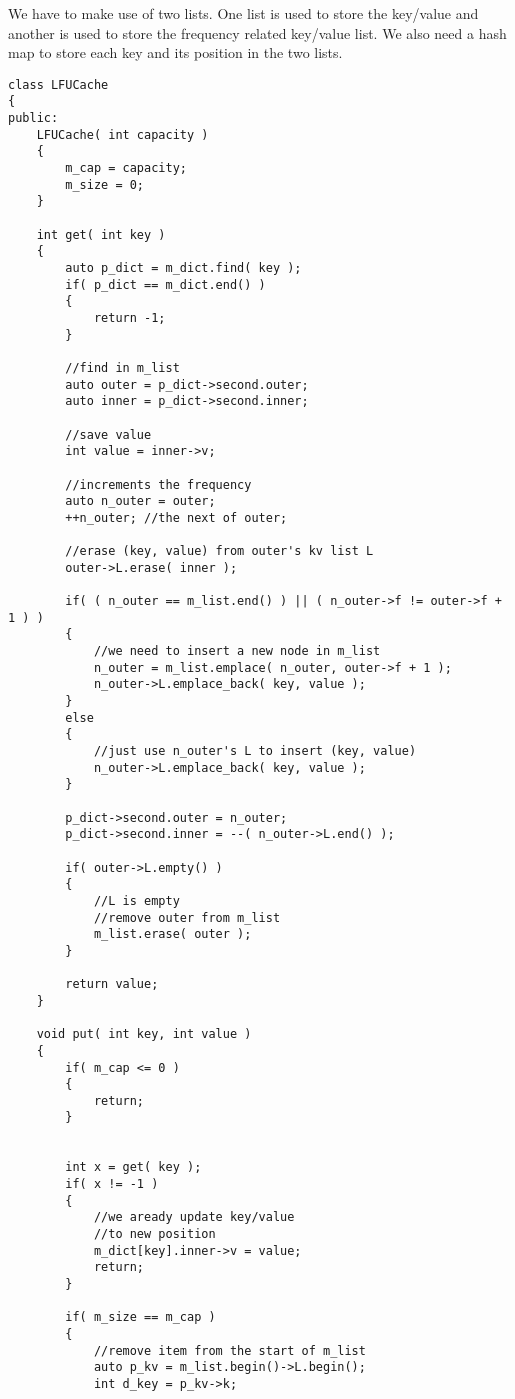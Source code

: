 We have to make use of two lists. One list is used to store the key/value and another is used to store the frequency related key/value list. We also need a hash map to store each key and its position in the two lists.

\setcounter{lstlisting}{0}
\begin{lstlisting}[style=customc, caption={List And Hash Map}]
class LFUCache
{
public:
    LFUCache( int capacity )
    {
        m_cap = capacity;
        m_size = 0;
    }

    int get( int key )
    {
        auto p_dict = m_dict.find( key );
        if( p_dict == m_dict.end() )
        {
            return -1;
        }

        //find in m_list
        auto outer = p_dict->second.outer;
        auto inner = p_dict->second.inner;

        //save value
        int value = inner->v;

        //increments the frequency
        auto n_outer = outer;
        ++n_outer; //the next of outer;

        //erase (key, value) from outer's kv list L
        outer->L.erase( inner );

        if( ( n_outer == m_list.end() ) || ( n_outer->f != outer->f + 1 ) )
        {
            //we need to insert a new node in m_list
            n_outer = m_list.emplace( n_outer, outer->f + 1 );
            n_outer->L.emplace_back( key, value );
        }
        else
        {
            //just use n_outer's L to insert (key, value)
            n_outer->L.emplace_back( key, value );
        }

        p_dict->second.outer = n_outer;
        p_dict->second.inner = --( n_outer->L.end() );

        if( outer->L.empty() )
        {
            //L is empty
            //remove outer from m_list
            m_list.erase( outer );
        }

        return value;
    }

    void put( int key, int value )
    {
        if( m_cap <= 0 )
        {
            return;
        }


        int x = get( key );
        if( x != -1 )
        {
            //we aready update key/value
            //to new position
            m_dict[key].inner->v = value;
            return;
        }

        if( m_size == m_cap )
        {
            //remove item from the start of m_list
            auto p_kv = m_list.begin()->L.begin();
            int d_key = p_kv->k;


\end{lstlisting}
